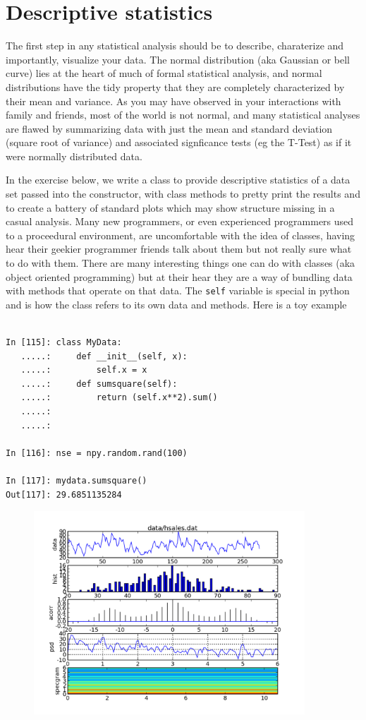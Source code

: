\section{Descriptive statistics}
\label{sec:stats_descriptives}

The first step in any statistical analysis should be to describe,
charaterize and importantly, visualize your data.  The normal
distribution (aka Gaussian or bell curve) lies at the heart of much of
formal statistical analysis, and normal distributions have the tidy
property that they are completely characterized by their mean and
variance.  As you may have observed in your interactions with family
and friends, most of the world is not normal, and many statistical
analyses are flawed by summarizing data with just the mean and
standard deviation (square root of variance) and associated
signficance tests (eg the T-Test) as if it were normally distributed
data.

In the exercise below, we write a class to provide descriptive
statistics of a data set passed into the constructor, with class
methods to pretty print the results and to create a battery of
standard plots which may show structure missing in a casual analysis.
Many new programmers, or even experienced programmers used to a
proceedural environment, are uncomfortable with the idea of classes,
having hear their geekier programmer friends talk about them but not
really sure what to do with them.  There are many interesting things
one can do with classes (aka object oriented programming) but at their
hear they are a way of bundling data with methods that operate on that
data.  The \texttt{self} variable is special in python and is how the
class refers to its own data and methods.  Here is a toy example

\begin{lstlisting}

In [115]: class MyData:
   .....:     def __init__(self, x):
   .....:         self.x = x
   .....:     def sumsquare(self):
   .....:         return (self.x**2).sum()
   .....:     
   .....:     

In [116]: nse = npy.random.rand(100)

In [117]: mydata.sumsquare()
Out[117]: 29.6851135284

\end{lstlisting}




\begin{figure}
\begin{centering}\includegraphics[width=4in]{fig/stats_descriptives}\par\end{centering}

\caption{\label{fig:stats_descriptives}}
\end{figure}
